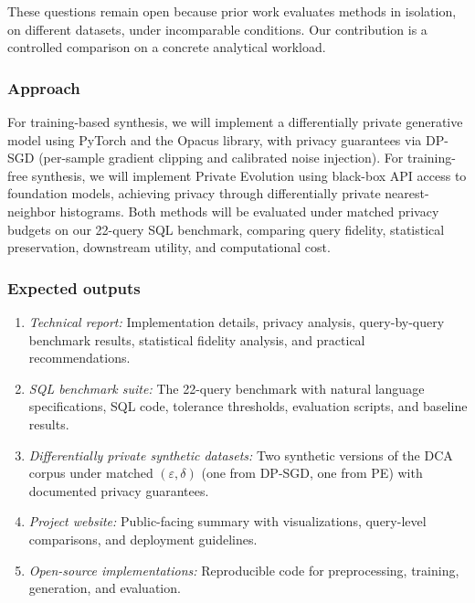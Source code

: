 \documentclass[12pt,letterpaper]{article}
\renewcommand{\_}{\textunderscore\allowbreak}
\begin{document}
These questions remain open because prior work evaluates methods in isolation, on different datasets, under incomparable conditions. Our contribution is a controlled comparison on a concrete analytical workload.

\subsubsection{Approach}

For training-based synthesis, we will implement a differentially private generative model using PyTorch and the Opacus library, with privacy guarantees via DP-SGD (per-sample gradient clipping and calibrated noise injection). For training-free synthesis, we will implement Private Evolution using black-box API access to foundation models, achieving privacy through differentially private nearest-neighbor histograms. Both methods will be evaluated under matched privacy budgets on our 22-query SQL benchmark, comparing query fidelity, statistical preservation, downstream utility, and computational cost.

\subsubsection{Expected outputs}

\begin{enumerate}
    \item \textit{Technical report:} Implementation details, privacy analysis, query-by-query benchmark results, statistical fidelity analysis, and practical recommendations.
    
    \item \textit{SQL benchmark suite:} The 22-query benchmark with natural language specifications, SQL code, tolerance thresholds, evaluation scripts, and baseline results.
    
    \item \textit{Differentially private synthetic datasets:} Two synthetic versions of the DCA corpus under matched $(\varepsilon, \delta)$ (one from DP-SGD, one from PE) with documented privacy guarantees.
    
    \item \textit{Project website:} Public-facing summary with visualizations, query-level comparisons, and deployment guidelines.
    
    \item \textit{Open-source implementations:} Reproducible code for preprocessing, training, generation, and evaluation.
\end{enumerate}
\end{document}
